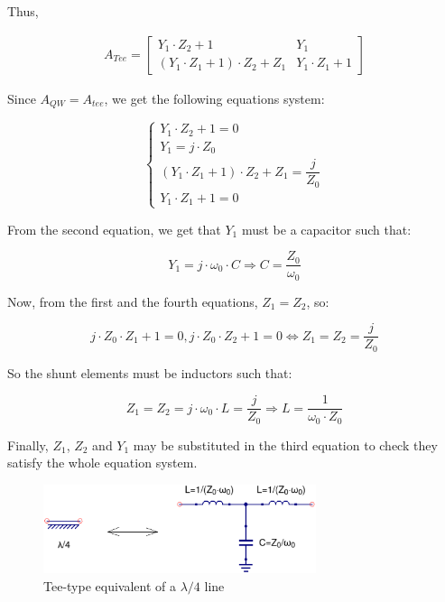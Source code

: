 \noindent Thus,

\begin{gather}
  A_{Tee} = 
 \begin{bmatrix} Y_1 \cdot Z_2 + 1 & Y_1 \\ (Y_1 \cdot Z_1 + 1) \cdot Z_2 + Z_1 & Y_1 \cdot Z_1 + 1 \end{bmatrix}
 \label{eq:tee-network-equivalent}
\end{gather}

\noindent Since $A_{QW} = A_{tee}$, we get the following equations system:

\begin{equation}
\begin{cases} Y_1 \cdot Z_2 + 1 = 0\\ Y_1 = j\cdot Z_0 \\ (Y_1 \cdot Z_1 + 1) \cdot Z_2 + Z_1 = \dfrac{j}{Z_0} \\ Y_1 \cdot Z_1 + 1 = 0\end{cases} 
\end{equation}

\noindent From the second equation, we get that $Y_1$ must be a capacitor such that:

\begin{equation}
Y_1 = j\cdot \omega_0 \cdot C \Longrightarrow C = \dfrac{Z_0}{\omega_0}
\end{equation}

\noindent Now, from the first and the fourth equations, $Z_1 = Z_2$, so:

\begin{equation}
j \cdot Z_0 \cdot Z_1 + 1 = 0, j \cdot Z_0 \cdot Z_2 + 1 = 0 \iff Z_1 = Z_2 = \dfrac{j}{Z_0}
\end{equation}

\noindent So the shunt elements must be inductors such that:

\begin{equation}
Z_1 = Z_2 = j \cdot \omega_0 \cdot L = \dfrac{j}{Z_0} \Longrightarrow L = \dfrac{1}{\omega_0 \cdot Z_0}
\end{equation}

\noindent Finally, $Z_1$, $Z_2$ and $Y_1$ may be substituted in the third equation to check they satisfy the whole equation system.

\begin{figure}[ht]
\begin{center}
\includegraphics[width=8cm]{bitmaps/synthesis/attenuators/Tee-equivalent-l4}
\end{center}
\caption{Tee-type equivalent of a $\lambda/4$ line}
\label{fig:tee-eq-l4}
\end{figure}
\FloatBarrier


